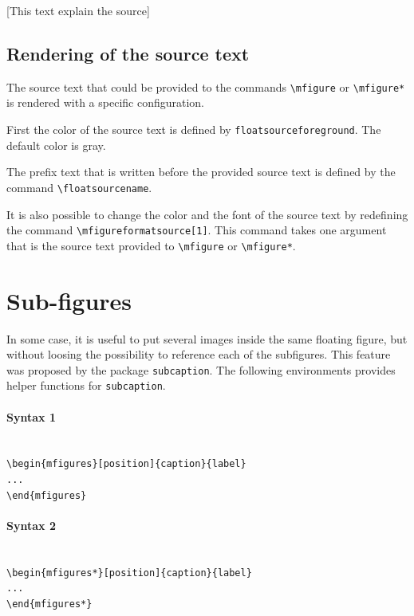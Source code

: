 \documentclass[book,taskpackage,specpackage,codepackage]{upmethodology-document}
\begin{document}
[This text explain the source]

\subsection{Rendering of the source text}

The source text that could be provided to the commands \texttt{{\textbackslash}mfigure} or \texttt{{\textbackslash}mfigure*} is rendered with a specific configuration.

First the color of the source text is defined by \texttt{floatsourceforeground}. The default color is \textcolor{floatsourceforeground}{gray}.

The prefix text that is written before the provided source text is defined by the command \texttt{{\textbackslash}floatsourcename}.

It is also possible to change the color and the font of the source text by redefining the command \texttt{{\textbackslash}mfigureformatsource[1]}. This command takes one argument that is the source text provided to \texttt{{\textbackslash}mfigure} or \texttt{{\textbackslash}mfigure*}.

\section{Sub-figures}

In some case, it is useful to put several images inside the same floating figure, but without loosing the possibility to reference each of the subfigures. This feature was proposed by the package \texttt{subcaption}. The following environments provides helper functions for \texttt{subcaption}.

\paragraph{Syntax 1} \mbox{}\\
\texttt{{\textbackslash}begin\{mfigures\}[position]\{caption\}\{label\}\\
...\\
{\textbackslash}end\{mfigures\}}

\paragraph{Syntax 2} \mbox{}\\
\texttt{{\textbackslash}begin\{mfigures*\}[position]\{caption\}\{label\}\\
...\\
{\textbackslash}end\{mfigures*\}}
\end{document}
